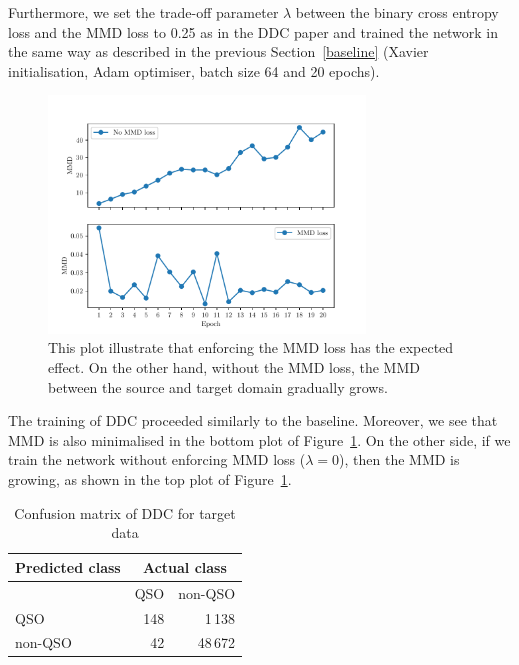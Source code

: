 Furthermore, we set the trade-off parameter \(\lambda\)
between the binary cross entropy loss
and the MMD loss to 0.25 as in the DDC paper
and trained the network in the same way as described in the previous Section~\ref{baseline}
(Xavier initialisation, Adam optimiser, batch size 64 and 20 epochs).

\begin{figure}
\begin{center}
\includegraphics[width=0.75\textwidth]{img/ddc_mmds.pdf}
\end{center}
\caption[Maximum mean discrepancy with and without MMD loss]{
	This plot illustrate that enforcing the MMD loss has the expected effect. On the other hand, without the MMD loss, the MMD between the source and target domain gradually grows.
}
\label{ddc_mmds}
\end{figure}

The training of DDC proceeded similarly to the baseline.
Moreover, we see that MMD is also minimalised in the bottom plot of Figure~\ref{ddc_mmds}.
On the other side, if we train the network without enforcing MMD loss (\(\lambda = 0\)),
then the MMD is growing, as shown in the top plot of Figure~\ref{ddc_mmds}.

\begin{table}
\begin{center}
\begin{tabular}{|l|r|r|}
	\hline
	Predicted class & \multicolumn{2}{c|}{Actual class} \\
	\hline \hline
	& QSO & non-QSO \\ \hline
	QSO & 148 & 1\,138 \\ \hline
	non-QSO & 42 & 48\,672 \\ \hline
\end{tabular}
\end{center}
\caption{Confusion matrix of DDC for target data}
\label{ddc_confusion}
\end{table}

